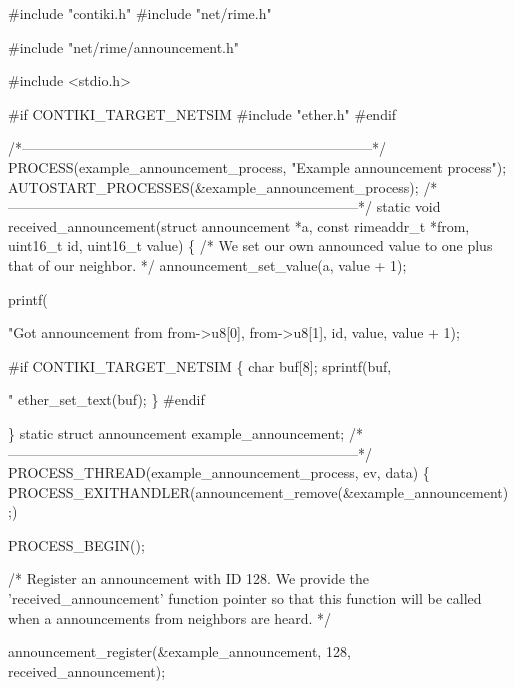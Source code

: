 \begin{DoxyCodeInclude}
\textcolor{preprocessor}{#include "contiki.h"}
\textcolor{preprocessor}{#include "net/rime.h"}

\textcolor{preprocessor}{#include "net/rime/announcement.h"}

\textcolor{preprocessor}{#include <stdio.h>}

\textcolor{preprocessor}{#if CONTIKI\_TARGET\_NETSIM}
\textcolor{preprocessor}{#include "ether.h"}
\textcolor{preprocessor}{#endif}

\textcolor{comment}{/*---------------------------------------------------------------------------*/}
PROCESS(example\_announcement\_process, \textcolor{stringliteral}{"Example announcement process"});
AUTOSTART\_PROCESSES(&example\_announcement\_process);
\textcolor{comment}{/*---------------------------------------------------------------------------*/}
\textcolor{keyword}{static} \textcolor{keywordtype}{void}
received\_announcement(\textcolor{keyword}{struct} announcement *a, \textcolor{keyword}{const} rimeaddr\_t *from,
                      uint16\_t \textcolor{keywordtype}{id}, uint16\_t value)
\{
  \textcolor{comment}{/* We set our own announced value to one plus that of our neighbor. */}
  announcement\_set\_value(a, value + 1);

  printf(\textcolor{stringliteral}{"Got announcement from %
         from->u8[0], from->u8[1], \textcolor{keywordtype}{id}, value, value + 1);

\textcolor{preprocessor}{#if CONTIKI\_TARGET\_NETSIM}
  \{
    \textcolor{keywordtype}{char} buf[8];
    sprintf(buf, \textcolor{stringliteral}{"%
    ether\_set\_text(buf);
  \}
\textcolor{preprocessor}{#endif}

\}
\textcolor{keyword}{static} \textcolor{keyword}{struct }announcement example\_announcement;
\textcolor{comment}{/*---------------------------------------------------------------------------*/}
PROCESS\_THREAD(example\_announcement\_process, ev, data)
\{
  PROCESS\_EXITHANDLER(announcement\_remove(&example\_announcement);)
    
  PROCESS\_BEGIN();

  \textcolor{comment}{/* Register an announcement with ID 128. We provide the}
\textcolor{comment}{     'received\_announcement' function pointer so that this function}
\textcolor{comment}{     will be called when a announcements from neighbors are heard. */}

  announcement\_register(&example\_announcement,
                        128,
                        received\_announcement);

}}
\end{DoxyCodeInclude}
